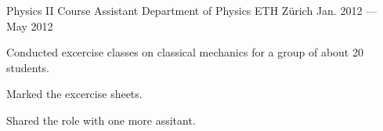 \begin{cventries}
  \cventry
    {Physics II Course Assistant} %
    {Department of Physics} %
    {ETH Z{\"u}rich} %
    {Jan. 2012 --- May 2012} %
    {
      \begin{cvitems} %
        \item {Conducted excercise classes on classical mechanics for a group of about 20 students.}
        \item {Marked the excercise sheets.} 
        \item {Shared the role with one more assitant.}
      \end{cvitems}
    }

\end{cventries}
